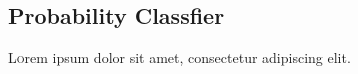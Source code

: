 \subsection{Probability Classfier}

\lettrine[nindent=0em,lines=3]{L} orem ipsum dolor sit amet, consectetur adipiscing elit.
\lipsum[2-3] %


